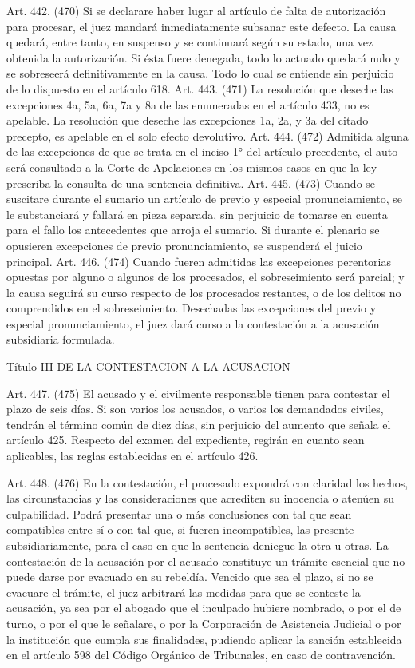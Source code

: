     Art. 442. (470) Si se declarare haber lugar al artículo de falta de autorización para procesar, el juez mandará inmediatamente subsanar este defecto.
    La causa quedará, entre tanto, en suspenso y se continuará según su estado, una vez obtenida la autorización.
    Si ésta fuere denegada, todo lo actuado quedará nulo y se sobreseerá definitivamente en la causa.
    Todo lo cual se entiende sin perjuicio de lo dispuesto en el artículo 618.
    Art. 443. (471) La resolución que deseche las excepciones 4a, 5a, 6a, 7a y 8a de las enumeradas en el artículo 433, no es apelable.
    La resolución que deseche las excepciones 1a, 2a, y 3a del citado precepto, es apelable en el solo efecto devolutivo.
    Art. 444. (472) Admitida alguna de las excepciones de que se trata en el inciso 1° del artículo precedente, el auto será consultado a la Corte de Apelaciones en los mismos casos en que la ley prescriba la consulta de una sentencia definitiva.
    Art. 445. (473) Cuando se suscitare durante el sumario un artículo de previo y especial pronunciamiento, se le substanciará y fallará en pieza separada, sin perjuicio de tomarse en cuenta para el fallo los antecedentes que arroja el sumario.
    Si durante el plenario se opusieren excepciones de previo pronunciamiento, se suspenderá el juicio principal.
    Art. 446. (474) Cuando fueren admitidas las excepciones perentorias opuestas por alguno o algunos de los procesados, el sobreseimiento será parcial; y la causa seguirá su curso respecto de los procesados restantes, o de los delitos no comprendidos en el sobreseimiento.
    Desechadas las excepciones del previo y especial pronunciamiento, el juez dará curso a la contestación a la acusación subsidiaria formulada.


    Título III
    DE LA CONTESTACION A LA ACUSACION

    Art. 447. (475) El acusado y el civilmente responsable tienen para contestar el plazo de seis días. Si son varios los acusados, o varios los demandados civiles, tendrán el término común de diez días, sin perjuicio del aumento que señala el artículo 425.
    Respecto del examen del expediente, regirán en cuanto sean aplicables, las reglas establecidas en el artículo 426.

    Art. 448. (476) En la contestación, el procesado expondrá con claridad los hechos, las circunstancias y las consideraciones que acrediten su inocencia o atenúen su culpabilidad.
    Podrá presentar una o más conclusiones con tal que sean compatibles entre sí o con tal que, si fueren incompatibles, las presente subsidiariamente, para el caso en que la sentencia deniegue la otra u otras.
    La contestación de la acusación por el acusado constituye un trámite esencial que no puede darse por evacuado en su rebeldía. Vencido que sea el plazo, si no se evacuare el trámite, el juez arbitrará las medidas para que se conteste la acusación, ya sea por el abogado que el inculpado hubiere nombrado, o por el de turno, o por el que le señalare, o por la Corporación de Asistencia Judicial o por la institución que cumpla sus finalidades, pudiendo aplicar la sanción establecida en el artículo 598 del Código Orgánico de Tribunales, en caso de contravención.


